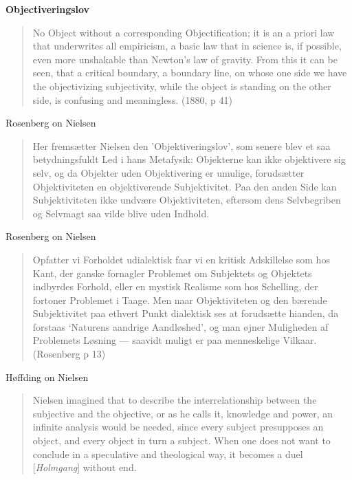 \documentclass[ignorenonframetext, ]{beamer}
\begin{document}
\begin{frame}

  \textbf{Objectiveringslov}

  \medskip \begin{quote} No Object without a corresponding
    Objectification; it is an a priori law that underwrites all
    empiricism, a basic law that in science is, if possible, even more
    unshakable than Newton's law of gravity. From this it can be seen,
    that a critical boundary, a boundary line, on whose one side we
    have the objectivizing subjectivity, while the object is standing
    on the other side, is confusing and meaningless. (1880, p 41)
\end{quote}
\end{frame}

\begin{frame}{Rosenberg on Nielsen}

  \begin{quote} Her fremsætter Nielsen den 'Objektiveringslov', som
    senere blev et saa betydningsfuldt Led i hans Metafysik:
    Objekterne kan ikke objektivere sig selv, og da Objekter uden
    Objektivering er umulige, forudsætter Objektiviteten en
    objektiverende Subjektivitet. Paa den anden Side kan
    Subjektiviteten ikke undvære Objektiviteten, eftersom dens
    Selvbegriben og Selvmagt saa vilde blive uden Indhold.
\end{quote}

\end{frame}

\begin{frame}{Rosenberg on Nielsen}

  \begin{quote}
    Opfatter vi Forholdet udialektisk faar vi en kritisk Adskillelse
    som hos Kant, der ganske fornagler Problemet om Subjektets og
    Objektets indbyrdes Forhold, eller en mystisk Realisme som hos
    Schelling, der fortoner Problemet i Taage.  Men naar
    Objektiviteten og den bærende Subjektivitet paa ethvert Punkt
    dialektisk ses at forudsætte hianden, da forstaas `Naturens
    aandrige Aandløshed', og man øjner Muligheden af Problemets
    Løsning --- saavidt muligt er paa menneskelige Vilkaar. (Rosenberg
    p 13) \end{quote} \end{frame}

\begin{frame}{Høffding on Nielsen}
  
  \begin{quote} Nielsen imagined that to describe the
    interrelationship between the subjective and the objective, or as
    he calls it, knowledge and power, an infinite analysis would be
    needed, since every subject presupposes an object, and every
    object in turn a subject. When one does not want to conclude in a
    speculative and theological way, it becomes a duel
    [\emph{Holmgang}] without end.
  \end{quote}
  
\end{frame}
\end{document}
